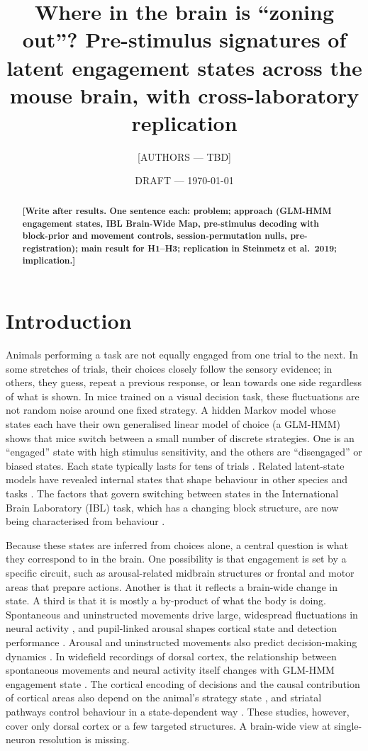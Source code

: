 \documentclass[11pt]{article}
\title{Where in the brain is ``zoning out''? Pre-stimulus signatures of latent engagement states across the mouse brain, with cross-laboratory replication}
\author{[AUTHORS --- TBD]}
\date{DRAFT --- \today}
\newcommand{\todo}[1]{\textbf{[#1]}}
\begin{document}
\maketitle

\begin{abstract}
\todo{Write after results. One sentence each: problem; approach (GLM-HMM engagement states, IBL Brain-Wide Map, pre-stimulus decoding with block-prior and movement controls, session-permutation nulls, pre-registration); main result for H1--H3; replication in Steinmetz et al.\ 2019; implication.}
\end{abstract}

\section{Introduction}

Animals performing a task are not equally engaged from one trial to the next. In some stretches of trials, their choices closely follow the sensory evidence; in others, they guess, repeat a previous response, or lean towards one side regardless of what is shown. In mice trained on a visual decision task, these fluctuations are not random noise around one fixed strategy. A hidden Markov model whose states each have their own generalised linear model of choice (a GLM-HMM) shows that mice switch between a small number of discrete strategies. One is an ``engaged'' state with high stimulus sensitivity, and the others are ``disengaged'' or biased states. Each state typically lasts for tens of trials \citep{ashwood2022}. Related latent-state models have revealed internal states that shape behaviour in other species and tasks \citep{calhoun2019}. The factors that govern switching between states in the International Brain Laboratory (IBL) task, which has a changing block structure, are now being characterised from behaviour \citep{mohammadi2025}.

Because these states are inferred from choices alone, a central question is what they correspond to in the brain. One possibility is that engagement is set by a specific circuit, such as arousal-related midbrain structures or frontal and motor areas that prepare actions. Another is that it reflects a brain-wide change in state. A third is that it is mostly a by-product of what the body is doing. Spontaneous and uninstructed movements drive large, widespread fluctuations in neural activity \citep{stringer2019,musall2019}, and pupil-linked arousal shapes cortical state and detection performance \citep{mcginley2015}. Arousal and uninstructed movements also predict decision-making dynamics \citep{hulsey2024}. In widefield recordings of dorsal cortex, the relationship between spontaneous movements and neural activity itself changes with GLM-HMM engagement state \citep{yin2025}. The cortical encoding of decisions and the causal contribution of cortical areas also depend on the animal's strategy state \citep{mohammadi2026,han2026}, and striatal pathways control behaviour in a state-dependent way \citep{bolkan2022}. These studies, however, cover only dorsal cortex or a few targeted structures. A brain-wide view at single-neuron resolution is missing.
\end{document}
